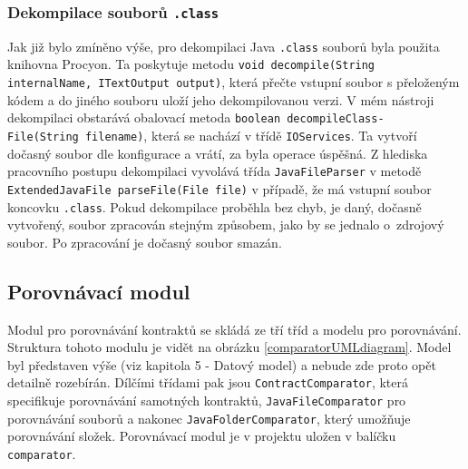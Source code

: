 		\subsubsection{Dekompilace souborů \texttt{.class}}
			Jak již bylo zmíněno výše, pro dekompilaci Java \texttt{.class} souborů byla použita knihovna Procyon. Ta poskytuje metodu \texttt{void decompile(String internalName, ITextOutput output)}, která přečte vstupní soubor s přeloženým kódem a do jiného souboru uloží jeho dekompilovanou verzi. V mém nástroji dekompilaci obstarává obalovací metoda \texttt{boolean decompileClass-\\File(String filename)}, která se nachází v třídě \texttt{IOServices}. Ta vytvoří dočasný soubor dle konfigurace a vrátí, za byla operace úspěšná. Z hlediska pracovního postupu dekompilaci vyvolává třída \texttt{JavaFileParser} v metodě \texttt{ExtendedJavaFile parseFile(File file)} v případě, že má vstupní soubor koncovku \texttt{.class}. Pokud dekompilace proběhla bez chyb, je daný, dočasně vytvořený, soubor zpracován stejným způsobem, jako by se jednalo o~zdrojový soubor. Po zpracování je dočasný soubor smazán.
					

	    


		

	    \subsection{Porovnávací modul}
	    	Modul pro porovnávání kontraktů se skládá ze tří tříd a modelu pro porovnávání. Struktura tohoto modulu je vidět na obrázku \ref{comparatorUMLdiagram}. Model byl představen výše (viz kapitola 5 - Datový model) a nebude zde proto opět detailně rozebírán. Dílčími třídami pak jsou \texttt{ContractComparator}, která specifikuje porovnávání samotných kontraktů, \texttt{JavaFileComparator} pro porovnávání souborů a nakonec \texttt{JavaFolderComparator}, který umožňuje porovnávání složek. Porovnávací modul je v projektu uložen v balíčku \texttt{comparator}.\\
	    	
